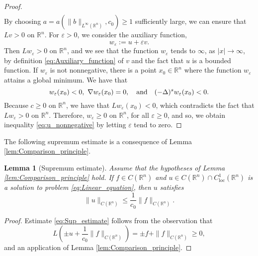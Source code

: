 \documentclass[11pt,reqno]{amsart}
\newtheorem{lem}[thm]{Lemma}
\theoremstyle{definition}
\theoremstyle{remark}
\begin{document}
\begin{proof}
\begin{align*}
\end{align*}
By choosing $a=a(\|b\|_{L^{\infty}({\mathbb{R}}^n)}, c_0)\geq 1$ sufficiently large, we can ensure that $Lv >0$ on ${\mathbb{R}}^n$. For ${\varepsilon}>0$, we consider the auxiliary function,
$$
w_{\varepsilon}:=u+{\varepsilon} v.
$$
Then $Lw_{\varepsilon} >0$ on ${\mathbb{R}}^n$, and we see that the function $w_{\varepsilon}$ tends to $ \infty$, as $|x|\rightarrow\infty$, by definition \eqref{eq:Auxiliary_function} of $v$ and the fact that $u$ is a bounded function. If $w_{\varepsilon}$ is not nonnegative, there is a point $x_0\in{\mathbb{R}}^n$ where the function $w_{\varepsilon}$ attains a global minimum. We have that
$$
w_{\varepsilon}(x_0)<0,\ \nabla w_{\varepsilon}(x_0)=0,\quad\hbox{and}\quad (-\Delta)^sw_{\varepsilon}(x_0)<0.
$$
Because $c \geq 0$ on ${\mathbb{R}}^n$, we have that $L w_{\varepsilon}(x_0)<0$, which contradicts the fact that $Lw_{\varepsilon} >0$ on ${\mathbb{R}}^n$. Therefore, $w_{\varepsilon} \geq 0$ on ${\mathbb{R}}^n$, for all ${\varepsilon} \geq 0$, and so, we obtain inequality \eqref{eq:u_nonnegative} by letting ${\varepsilon}$ tend to zero.
\end{proof}

The following supremum estimate is a consequence of Lemma \ref{lem:Comparison_principle}.

\begin{lem}[Supremum estimate]
\label{lem:Sup_estimate}
Assume that the hypotheses of Lemma \ref{lem:Comparison_principle} hold. If $f \in C({\mathbb{R}}^n)$ and $u \in C({\mathbb{R}}^n)\cap C^1_{\operatorname{loc}}({\mathbb{R}}^n)$ is a solution to problem \eqref{eq:Linear_equation}, then $u$ satisfies
\begin{equation}
\label{eq:Sup_estimate}
\|u\|_{C({\mathbb{R}}^n)} \leq \frac{1}{c_0}\|f\|_{C({\mathbb{R}}^n)}.
\end{equation}
\end{lem}

\begin{proof}
Estimate \eqref{eq:Sup_estimate} follows from the observation that
$$
L\left(\pm u+\frac{1}{c_0}\|f\|_{C({\mathbb{R}}^n)}\right) =\pm f+\|f\|_{C({\mathbb{R}}^n)} \geq 0,
$$
and an application of Lemma \ref{lem:Comparison_principle}.
\end{proof}
\end{document}
